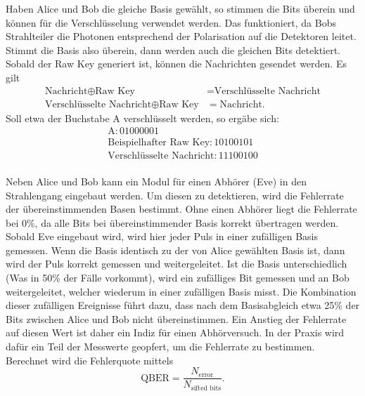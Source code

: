 \noindent Haben Alice und Bob die gleiche Basis gewählt, so stimmen die Bits überein
und können für die Verschlüsselung verwendet werden. Das funktioniert, da Bobs 
Strahlteiler die Photonen entsprechend der Polarisation auf die Detektoren leitet. 
Stimmt die Basis also überein, dann werden auch die gleichen Bits detektiert. 
Sobald der Raw Key generiert ist, können die Nachrichten gesendet werden. Es gilt 
\begin{align}
    \text{Nachricht} \oplus \text{Raw Key} &= \text{Verschlüsselte Nachricht} \\
    \text{Verschlüsselte Nachricht} \oplus \text{Raw Key} &= \text{Nachricht}.
\end{align}
Soll etwa der Buchstabe A \cite{Ainbinär} verschlüsselt werden, so ergäbe sich:
\begin{align*}
    \text{A}: 01000001 \\
    \text{Beispielhafter Raw Key}: 10100101 \\
    \text{Verschlüsselte Nachricht}: 11100100
\end{align*}
\vspace{0.5cm}
\\
\noindent Neben Alice und Bob kann ein Modul für einen Abhörer (Eve) in den 
Strahlengang eingebaut werden. Um diesen zu detektieren, wird die Fehlerrate der 
übereinstimmenden Basen bestimmt. Ohne einen Abhörer liegt die Fehlerrate bei 0\%,
da alle Bits bei übereinstimmender Basis korrekt übertragen werden. Sobald Eve
eingebaut wird, wird hier jeder Puls in einer zufälligen Basis gemessen. Wenn die 
Basis identisch zu der von Alice gewählten Basis ist, dann wird der Puls korrekt
gemessen und weitergeleitet. Ist die Basis unterschiedlich (Was in 50\% der Fälle
vorkommt), wird ein zufälliges Bit gemessen und an Bob weitergeleitet, welcher 
wiederum in einer zufälligen Basis misst. Die Kombination dieser zufälligen 
Ereignisse führt dazu, dass nach dem Basisabgleich etwa 25\% der Bits zwischen 
Alice und Bob nicht übereinstimmen. Ein Anstieg der Fehlerrate auf diesen Wert ist
daher ein Indiz für einen Abhörversuch. In der Praxis wird dafür ein Teil der 
Messwerte geopfert, um die Fehlerrate zu bestimmen. Berechnet wird die Fehlerquote 
mittels
\begin{equation}
    \text{QBER} = \frac{N_\text{error}}{N_\text{sifted bits}}.
\end{equation}


